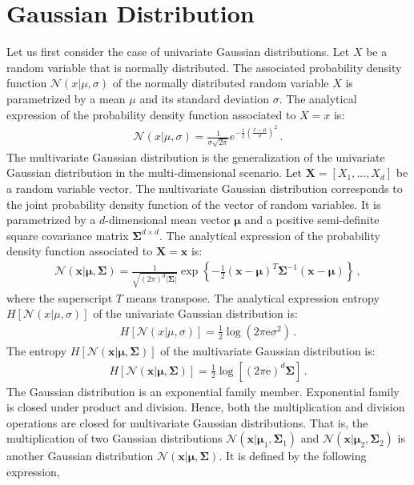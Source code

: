 \section{Gaussian Distribution} \label{sec-appendix-Gaussian}
Let us first consider the case of univariate Gaussian distributions. Let $X$ be a random variable that is normally distributed. The associated probability density function $\mathcal{N}(x|\mu, \sigma)$ of the normally distributed random variable $X$ is parametrized by a mean $\mu$ and its standard deviation $\sigma$. The analytical expression of the probability density function associated to $X=x$ is:
\begin{align}
\mathcal{N}(x|\mu, \sigma) = \frac{1}{\sigma\sqrt{2\pi}}e^{-\frac{1}{2}(\frac{x-\mu}{\sigma})^2}\,.
\end{align}
The multivariate Gaussian distribution is the generalization of the univariate Gaussian distribution in the multi-dimensional scenario. Let $\mathbf{X} = [X_1,...,X_d]$ be a random variable vector. The multivariate Gaussian distribution corresponds to the joint probability density function of the vector of random variables. It is parametrized by a $d$-dimensional mean vector $\boldsymbol{\mu}$ and a positive semi-definite square covariance matrix $\boldsymbol{\Sigma}^{d \times d}$. The analytical expression of the probability density function associated to $\mathbf{X}=\mathbf{x}$ is:
\begin{align}
\mathcal{N}(\mathbf{x}|\bm{\mu}, \bm{\Sigma}) = \frac{1}{\sqrt{(2\pi)^d |\bm{\Sigma}|}} 
\exp \left\{ - \frac{1}{2} \left( \mathbf{x} - \bm{\mu} \right)^T \bm{\Sigma}^{-1} 
\left( \mathbf{x} - \bm{\mu} \right) \right\}\,, \label{eq:Appendix_Gaussian}
\end{align}
where the superscript $T$ means transpose. The analytical expression entropy $H[\mathcal{N}(x|\mu, \sigma)]$ of the univariate Gaussian distribution is:
\begin{align}
H[\mathcal{N}(x|\mu, \sigma)] = \frac{1}{2}\log(2\pi \text{e} \sigma^2)\,.
\end{align}
The entropy $H[\mathcal{N}(\mathbf{x}|\bm{\mu}, \bm{\Sigma})]$ of the multivariate Gaussian distribution is:
\begin{align}
H[\mathcal{N}(\mathbf{x}|\bm{\mu}, \bm{\Sigma})] = \frac{1}{2}\log[(2\pi \text{e})^d\bm{\Sigma}]\,.
\end{align}
The Gaussian distribution is an exponential family member. Exponential family is closed under product and division. Hence, both the multiplication and division operations are closed for multivariate Gaussian distributions. That is, the multiplication of two Gaussian distributions $\mathcal{N}(\mathbf{x}|\bm{\mu}_1,\bm{\Sigma}_1)$ and $\mathcal{N}(\mathbf{x}|\bm{\mu}_2,\bm{\Sigma}_2)$ is another Gaussian distribution $\mathcal{N}(\mathbf{x}|\bm{\mu},\bm{\Sigma})$. It is defined by the following expression, 
